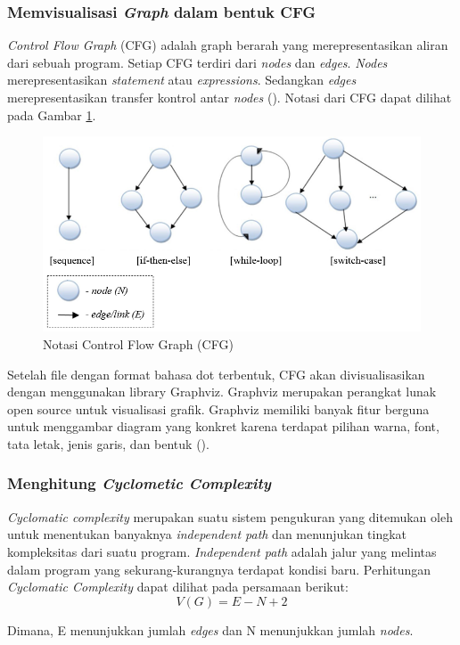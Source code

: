 \subsubsection*{Memvisualisasi \textit{Graph} dalam bentuk CFG}
\textit{Control Flow Graph }(CFG) adalah graph berarah yang merepresentasikan aliran dari sebuah program. Setiap CFG terdiri dari \textit{nodes} dan \textit{edges}. \textit{Nodes} merepresentasikan \textit{statement} atau \textit{expressions}. Sedangkan \textit{edges} merepresentasikan transfer kontrol antar \textit{nodes} (\cite{MCCABE}). Notasi dari CFG dapat dilihat pada Gambar \ref{fig:cfg}.
\begin{figure}[h]
	\centering
	\includegraphics[width=0.9\linewidth]{gambar/CFG}
	\caption{Notasi Control Flow Graph (CFG)}
	\label{fig:cfg}
\end{figure}
Setelah file dengan format bahasa dot terbentuk, CFG akan divisualisasikan dengan menggunakan library Graphviz. Graphviz merupakan perangkat lunak open source untuk visualisasi grafik. Graphviz memiliki banyak fitur berguna untuk menggambar diagram yang konkret karena terdapat pilihan warna, font, tata letak, jenis garis, dan bentuk (\cite{ELLSONGRAPHVIZ2003}).
\subsubsection*{Menghitung \textit{Cyclometic Complexity}}

\textit{Cyclomatic complexity} merupakan suatu sistem pengukuran yang ditemukan oleh \citeauthor{MCCABE} untuk menentukan banyaknya \textit{independent path} dan menunjukan tingkat kompleksitas dari suatu program. \textit{Independent path} adalah jalur yang melintas dalam program yang sekurang-kurangnya terdapat kondisi baru. Perhitungan \textit{Cyclomatic Complexity} dapat dilihat pada persamaan berikut:
\[V(G)=E-N+2\]

Dimana, E menunjukkan jumlah \textit{edges} dan N menunjukkan jumlah \textit{nodes}.

